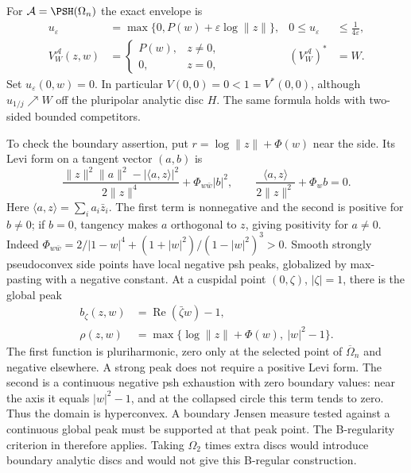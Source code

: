 \begin{example}
\label{ex:appH-Hartogs-restricted-envelope}
For $\mathcal A=\PSH(\Omega_n)$ the exact envelope is
\begin{equation*}
\begin{aligned}
 u_\varepsilon&=\max\{0,P(w)+\varepsilon\log\|z\|\},
 &0\leq u_\varepsilon&\leq\frac1{4\varepsilon},\\
 V_W^{\mathcal A}(z,w)
   &=\begin{cases}P(w),&z\ne0,\\0,&z=0,\end{cases}
 &(V_W^{\mathcal A})^*&=W.
\end{aligned}
\tag{H.50}\label{eq:appH-Hartogs-envelope}
\end{equation*}
Set $u_\varepsilon(0,w)=0$. In particular $V(0,0)=0<1=V^*(0,0)$,
although $u_{1/j}\nearrow W$ off the pluripolar analytic disc $H$.
The same formula holds with two-sided bounded competitors.
\end{example}

To check the boundary assertion, put $r=\log\|z\|+\Phi(w)$ near
the side. Its Levi form on a tangent vector $(a,b)$ is
\[
 \frac{\|z\|^2\|a\|^2-|\langle a,z\rangle|^2}{2\|z\|^4}
       +\Phi_{w\bar w}|b|^2,
 \qquad
 \frac{\langle a,z\rangle}{2\|z\|^2}+\Phi_w b=0.
\]
Here $\langle a,z\rangle=\sum_i a_i\bar z_i$.
The first term is nonnegative and the second is positive for $b\ne0$;
if $b=0$, tangency makes $a$ orthogonal to $z$, giving positivity
for $a\ne0$. Indeed
$\Phi_{w\bar w}=2/|1-w|^4+(1+|w|^2)/(1-|w|^2)^3>0$.
Smooth strongly pseudoconvex side points have local negative psh peaks,
globalized by max-pasting with a negative constant. At a cuspidal point
$(0,\zeta)$, $|\zeta|=1$, there is the global peak
\begin{equation*}
\begin{aligned}
 b_\zeta(z,w)&=\operatorname{Re}(\bar\zeta w)-1,\\
 \rho(z,w)&=\max\{\log\|z\|+\Phi(w),\ |w|^2-1\}.
\end{aligned}
\tag{H.51}\label{eq:appH-Hartogs-peaks}
\end{equation*}
The first function is pluriharmonic, zero only at the selected point
of $\overline\Omega_n$ and negative elsewhere. A strong peak does not
require a positive Levi form. The second is a continuous negative psh
exhaustion with zero boundary values: near the axis it equals $|w|^2-1$,
and at the collapsed circle this term tends to zero. Thus the domain
is hyperconvex. A boundary Jensen measure tested against a continuous
global peak must be supported at that peak point. The B-regularity
criterion in \cite[Corollary~3.8, printed p.~188]{Wikstrom01JensenPublished}
therefore applies. Taking $\Omega_2$ times extra discs would introduce
boundary analytic discs and would not give this B-regular construction.

